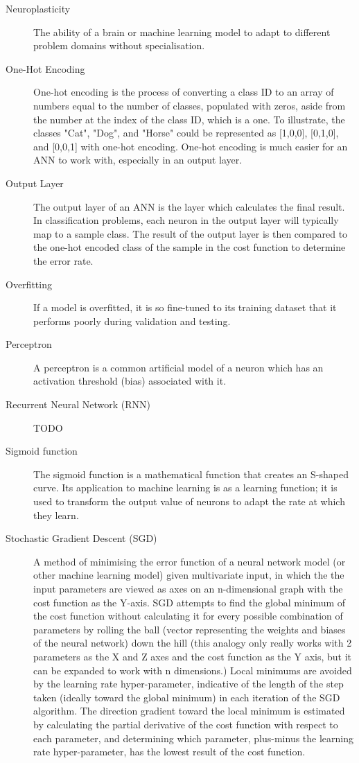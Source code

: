 \documentclass[]{report}
\begin{document}
\begin{description}
\item[Neuroplasticity] The ability of a brain or machine learning model to adapt to different problem domains without specialisation.

\item[One-Hot Encoding] One-hot encoding is the process of converting a class ID to an array of numbers equal to the number of classes, populated with zeros, aside from the number at the index of the class ID, which is a one. To illustrate, the classes "Cat", "Dog", and "Horse" could be represented as [1,0,0], [0,1,0], and [0,0,1] with one-hot encoding. One-hot encoding is much easier for an ANN to work with, especially in an output layer.

\item[Output Layer] The output layer of an ANN is the layer which calculates the final result. In classification problems, each neuron in the output layer will typically map to a sample class. The result of the output layer is then compared to the one-hot encoded class of the sample in the cost function to determine the error rate.

\item[Overfitting] If a model is overfitted, it is so fine-tuned to its training dataset that it performs poorly during validation and testing.

\item[Perceptron] A perceptron is a common artificial model of a neuron which has an activation threshold (bias) associated with it.

\item[Recurrent Neural Network (RNN)] TODO

\item[Sigmoid function] The sigmoid function is a mathematical function that creates an S-shaped curve. Its application to machine learning is as a learning function; it is used to transform the output value of neurons to adapt the rate at which they learn.

\item[Stochastic Gradient Descent (SGD)] A method of minimising the error function of a neural network model (or other machine learning model) given multivariate input, in which the the input parameters are viewed as axes on an n-dimensional graph with the cost function as the Y-axis. SGD attempts to find the global minimum of the cost function without calculating it for every possible combination of parameters by rolling the ball (vector representing the weights and biases of the neural network) down the hill (this analogy only really works with 2 parameters as the X and Z axes and the cost function as the Y axis, but it can be expanded to work with n dimensions.) Local minimums are avoided by the learning rate hyper-parameter, indicative of the length of the step taken (ideally toward the global minimum) in each iteration of the SGD algorithm. The direction gradient toward the local minimum is estimated by calculating the partial derivative of the cost function with respect to each parameter, and determining which parameter, plus-minus the learning rate hyper-parameter, has the lowest result of the cost function.


\end{description}
\end{document}
